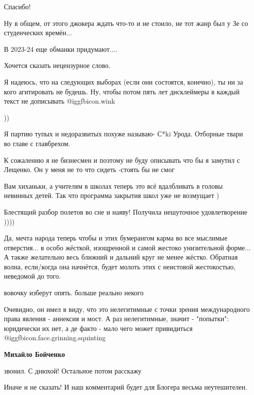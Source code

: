 \begin{itemize}
Спасибо!

Ну в общем, от этого джокера ждать что-то и не стоило, не тот жанр был у Зе со студенческих времён...

В 2023-24 еще обманки придумают....

Хочется сказать нецензурное слово.


Я надеюсь, что на следующих выборах (если они состоятся, конечно), ты ни за
кого агитировать не будешь. Ну, чтобы потом пять лет дисклеймеры в каждый текст
не дописывать  @igg{fbicon.wink} 

))

Я партию тупых и недоразвитых похуже называю- С*ki Урода. Отборные твари во главе с главбрехом.

К сожалению я не бизнесмен и поэтому не буду описывать что бы я замутил с Лещенко. Он у меня не то что сидеть -стоять бы не смог

Вам хиханьки, а учителям в школах теперь это всё вдалбливать в головы невинных детей. Так что программа закрытия школ уже не возмущает )

Блестящий разбор полетов во сне и наяву! Получила нешуточное удовлетворение ))))


Да, мечта народа теперь чтобы и этих бумерангом карма во все мыслимые
отверстия... в особо жёсткой, изощренной и самой жестоко унизительной форме...
А также желательно весь ближний и дальний круг не менее жёстко. Обратная волна,
если/когда она начнётся, будет молоть этих с неистовой жестокостью, неведомой
до того.

вовочку изберут опять. больше реально некого


Очевидно, он имел в виду, что это нелегитимные с точки зрения международного
права явления - аннексия и мост. А раз нелегитимные, значит - "попытки":
юридически их нет, а де факто - мало чего может привидиться  @igg{fbicon.face.grinning.squinting} 

\textbf{Михайло Бойченко} 

звонил. С днюхой! Остальное потом расскажу


Иначе и не сказать! И наш комментарий будет для Блогера весьма неутешителен.

\end{itemize} %
